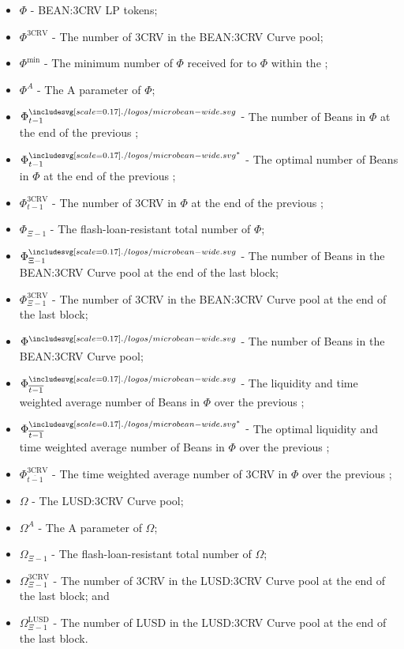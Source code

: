 \documentclass[class=article, crop=false]{standalone}
\begin{document}
\begin{itemize}[topsep=0pt, itemsep=3pt,leftmargin=16pt]
    \item[] $\Phi$ - \hypertarget{ht187}{BEAN:3CRV LP tokens};
    \item[] $\Phi^{\text{3CRV}}$ - \hypertarget{ht189}{The number of 3CRV in the BEAN:3CRV Curve pool};
    \item[] $\Phi^{\text{min}}$ - \hypertarget{ht191}{The minimum number of $\Phi$ received for  to  $\Phi$ within the };
    \item[] $\Phi^{A}$ - \hypertarget{ht190}{The A parameter of $\Phi$};
    \item[] $\Phi_{t-1}^{\bean}$ - \hypertarget{ht195}{The number of Beans in $\Phi$ at the end of the previous };
    \item[] $\Phi_{t-1}^{{\bean}^*}$ - \hypertarget{ht196}{The optimal number of Beans in $\Phi$ at the end of the previous };
    \item[] $\Phi_{t-1}^{\text{3CRV}}$ - \hypertarget{ht197}{The number of 3CRV in $\Phi$ at the end of the previous };
    \item[] $\Phi_{\Xi-1}$ - \hypertarget{ht192}{The flash-loan-resistant total number of $\Phi$};
    \item[] $\Phi_{\Xi-1}^{\bean}$ - \hypertarget{ht193}{The number of Beans in the BEAN:3CRV Curve pool at the end of the last block};
    \item[] $\Phi_{\Xi-1}^{\text{3CRV}}$ - \hypertarget{ht194}{The number of 3CRV in the BEAN:3CRV Curve pool at the end of the last block};
    \item[] $\Phi^{\bean}$ - \hypertarget{ht188}{The number of Beans in the BEAN:3CRV Curve pool};
    \item[] $\Phi_{\overline{t-1}}^{\bean}$ - \hypertarget{ht198}{The liquidity and time weighted average number of Beans in $\Phi$ over the previous };
    \item[] $\Phi_{\overline{t-1}}^{{\bean}^*}$ - \hypertarget{ht199}{The optimal liquidity and time weighted average number of Beans in $\Phi$ over the previous };
    \item[] $\Phi_{\overline{t-1}}^{\text{3CRV}}$ - \hypertarget{ht200}{The time weighted average number of 3CRV in $\Phi$ over the previous };
    \item[] $\Omega$ - \hypertarget{ht237}{The LUSD:3CRV Curve pool};
    \item[] $\Omega^{A}$ - \hypertarget{ht238}{The A parameter of $\Omega$};
    \item[] $\Omega_{\Xi-1}$ - \hypertarget{ht239}{The flash-loan-resistant total number of $\Omega$};
    \item[] $\Omega_{\Xi-1}^{\text{3CRV}}$ - \hypertarget{ht240}{The number of 3CRV in the LUSD:3CRV Curve pool at the end of the last block}; and
    \item[] $\Omega_{\Xi-1}^{\text{LUSD}}$ - \hypertarget{ht241}{The number of LUSD in the LUSD:3CRV Curve pool at the end of the last block}.
\end{itemize}
\end{document}
